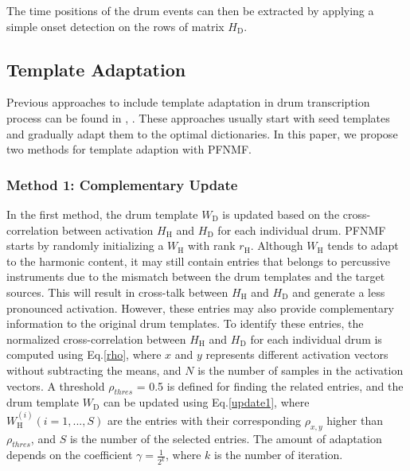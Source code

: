 \documentclass{article}
\begin{document}
The time positions of the drum events can then be extracted by applying a simple onset detection on the rows of matrix $H_\mathrm{D}$.

\subsection{Template Adaptation}\label{subsec:templateAdapt}
Previous approaches to include template adaptation in drum transcription process can be found in \cite{yoshii_drum_2007}, \cite{Dittmar2014}. These approaches usually start with seed templates and gradually adapt them to the optimal dictionaries. In this paper, we propose two methods for template adaption with PFNMF. 

\subsubsection{Method 1: Complementary Update}\label{subsubsec:method1}
In the first method, the drum template $W_\mathrm{D}$ is updated based on the cross-correlation between activation $H_\mathrm{H}$ and $H_\mathrm{D}$ for each individual drum. PFNMF starts by randomly initializing a $W_\mathrm{H}$ with rank $r_\mathrm{H}$. Although $W_\mathrm{H}$ tends to adapt to the harmonic content, it may still contain entries that belongs to percussive instruments due to the mismatch between the drum templates and the target sources. This will result in cross-talk between $H_\mathrm{H}$ and $H_\mathrm{D}$ and generate a less pronounced activation. However, these entries may also provide complementary information to the original drum templates. To identify these entries, the normalized cross-correlation between $H_\mathrm{H}$ and $H_\mathrm{D}$ for each individual drum is computed using Eq.\eqref{rho}, where $x$ and $y$ represents different activation vectors without subtracting the means, and $N$ is the number of samples in the activation vectors. A threshold $\rho_{thres}$ = 0.5 is defined for finding the related entries, and the drum template $W_\mathrm{D}$ can be updated using Eq.\eqref{update1}, where $W_\mathrm{H}^{(i)} (i = 1, ..., S)$ are the entries with their corresponding $\rho_{x, y}$ higher than $\rho_{thres}$, and $S$ is the number of the selected entries. The amount of adaptation depends on the coefficient $\gamma = \frac{1}{2^{k}}$, where $k$ is the number of iteration. 
\end{document}
